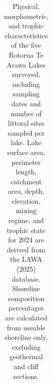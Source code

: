 \documentclass[
  12pt,
  a4paper,
  oneside]{scrbook}
\begin{document}
\begin{landscape}
\begingroup\fontsize{8}{10}\selectfont

\begin{longtable}[t]{>{\raggedright\arraybackslash}p{2.2cm}>{\raggedright\arraybackslash}p{1.8cm}>{\raggedleft\arraybackslash}p{0.9cm}>{\raggedleft\arraybackslash}p{0.9cm}>{\raggedleft\arraybackslash}p{0.9cm}>{\raggedleft\arraybackslash}p{0.9cm}>{\raggedleft\arraybackslash}p{0.9cm}>{\raggedleft\arraybackslash}p{0.9cm}>{\raggedright\arraybackslash}p{1.5cm}>{\raggedright\arraybackslash}p{1.5cm}>{\raggedleft\arraybackslash}p{0.9cm}>{\raggedleft\arraybackslash}p{0.9cm}>{\raggedleft\arraybackslash}p{0.9cm}>{\raggedleft\arraybackslash}p{0.9cm}}

\caption{\label{tbl-lake-overview}Physical, morphometric, and trophic
characteristics of the five Rotorua Te Arawa Lakes surveyed, including
sampling dates and number of littoral sites sampled per lake. Lake
surface area, perimeter length, catchment area, depth, elevation, mixing
regime, and trophic state for 2024 are derived from the LAWA (2025)
database. Shoreline composition percentages are calculated from useable
shoreline only, excluding geothermal and cliff sections.}

\tabularnewline


\end{longtable}
\end{landscape}
\end{document}
